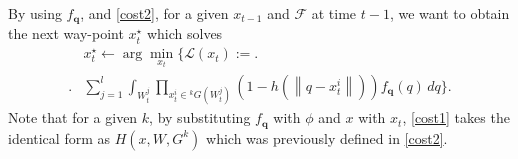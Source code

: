 \documentclass[letterpaper, 10 pt, conference]{ieeeconf}
\begin{document}
 By using $f_{\bm{q}}$, and \eqref{cost2}, for a given $x_{t-1}$ and $\mathcal{F}$ at time $t-1$, we want to obtain the next way-point $x_t^{\star}$ which solves
\begin{align}
&x_{t}^{\star} \gets \arg\min_{x_{t}}\Biggl\{\mathcal{L}(x_{t}):=\Biggr.
\nonumber \\
\Biggl.& \sum_{j = 1}^l \int_{W_t^j} \prod_{x_{t}^i \in {}^kG(W_t^j)} \left(1- h \left(\left\|
q - x_t^i \right\|  \right) \right){f}_{\bm{q}}(q)\,dq \Biggr\}.
\label{cost1}
\end{align}
Note that for a given $k$, by substituting ${f}_{\bm{q}}$ with $\phi$ and $x$ with $x_t$,  \eqref{cost1} takes the identical form as $H(x,W,G^k)$ which was previously defined in \eqref{cost2}.
\end{document}
